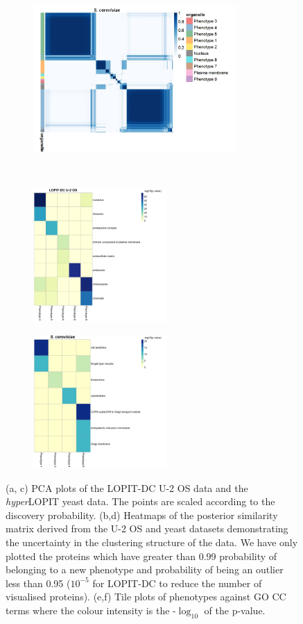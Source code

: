 \documentclass[12pt,english]{article}
\begin{document}
\begin{figure}
\begin{subfigure}[t]{0.5\textwidth}
	\caption{}
\end{subfigure}
\begin{subfigure}[t]{0.5\textwidth}
	\centering
	\includegraphics[height=2.2in]{heatmapYeast.jpeg}
	\caption{}
\end{subfigure}
~
\begin{subfigure}[t]{0.5\textwidth}
	\centering
	\includegraphics[height=2in]{pvaluesDC}
	\caption{}
\end{subfigure}
\begin{subfigure}[t]{0.5\textwidth}
	\centering
	\includegraphics[height=2in]{pvalueYeast}
	\caption{}
\end{subfigure}
\caption{(a, c) PCA plots of the LOPIT-DC U-2 OS data and the \textit{hyper}LOPIT yeast data. The points are scaled according to the discovery probability. (b,d) Heatmaps of the posterior similarity matrix derived from the U-2 OS and yeast datasets demonstrating the uncertainty in the clustering structure of the data. We have only plotted the proteins which have greater than 0.99 probability of belonging to a new phenotype and probability of being an outlier less than 0.95 ($10^{-5}$ for LOPIT-DC to reduce the number of visualised proteins). (e,f) Tile plots of phenotypes against GO CC terms where the colour intensity is the -$\log_{10}$ of the p-value.}
 \label{figure:DC}
\end{figure}
\end{document}
